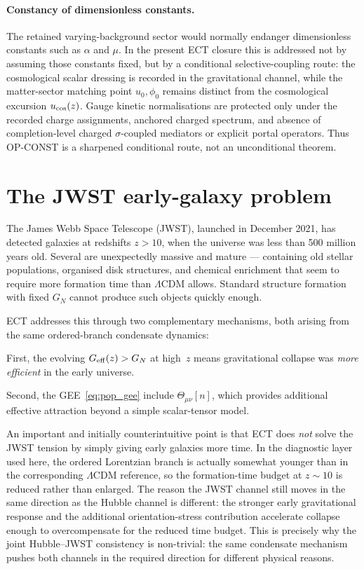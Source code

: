 \documentclass[11pt,a4paper]{article}
\begin{document}
\paragraph{Constancy of dimensionless constants.}
The retained varying-background sector would normally endanger dimensionless constants such as \(\alpha\) and \(\mu\). In the present ECT closure this is addressed not by assuming those constants fixed, but by a conditional selective-coupling route: the cosmological scalar dressing is recorded in the gravitational channel, while the matter-sector matching point \(u_0,\phi_0\) remains distinct from the cosmological excursion \(u_{\rm cos}(z)\). Gauge kinetic normalisations are protected only under the recorded charge assignments, anchored charged spectrum, and absence of completion-level charged \(\sigma\)-coupled mediators or explicit portal operators. Thus OP-CONST is a sharpened conditional route, not an unconditional theorem.


\section{The JWST early-galaxy problem}
\label{sec:pop_jwst}

The James Webb Space Telescope (JWST), launched in December 2021, has detected galaxies at redshifts $z > 10$, when the universe was less than 500 million years old. Several are unexpectedly massive and mature --- containing old stellar populations, organised disk structures, and chemical enrichment that seem to require more formation time than $\Lambda$CDM allows. Standard structure formation with fixed $G_N$ cannot produce such objects quickly enough.

ECT addresses this through two complementary mechanisms, both arising from the same ordered-branch condensate dynamics:

First, the evolving $G_{\rm eff}(z) > G_N$ at high~$z$ means gravitational collapse was \emph{more efficient} in the early universe.

Second, the GEE~\eqref{eq:pop_gee} include $\Theta_{\mu\nu}[n]$, which provides additional effective attraction beyond a simple scalar-tensor model.

An important and initially counterintuitive point is that ECT does \emph{not} solve the JWST tension by simply giving early galaxies more time. In the diagnostic layer used here, the ordered Lorentzian branch is actually somewhat younger than in the corresponding $\Lambda$CDM reference, so the formation-time budget at $z \sim 10$ is reduced rather than enlarged. The reason the JWST channel still moves in the same direction as the Hubble channel is different: the stronger early gravitational response and the additional orientation-stress contribution accelerate collapse enough to overcompensate for the reduced time budget. This is precisely why the joint Hubble--JWST consistency is non-trivial: the same condensate mechanism pushes both channels in the required direction for different physical reasons.
\end{document}
